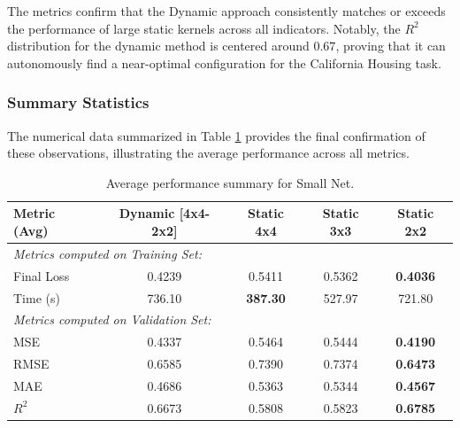 The metrics confirm that the Dynamic approach consistently matches or exceeds the performance of large static kernels across all indicators. Notably, the $R^2$ distribution for the dynamic method is centered around $0.67$, proving that it can autonomously find a near-optimal configuration for the California Housing task.

\subsubsection{Summary Statistics}

The numerical data summarized in Table \ref{tab:small_net_results} provides the final confirmation of these observations, illustrating the average performance across all metrics.

\begin{table}[h]
\centering
\scriptsize
\begin{tabular}{|l|c|c|c|c|}
\hline
\textbf{Metric (Avg)} & \textbf{Dynamic [4x4-2x2]} & \textbf{Static 4x4} & \textbf{Static 3x3} & \textbf{Static 2x2} \\ \hline
\multicolumn{5}{|l|}{\textit{Metrics computed on Training Set:}} \\ \hline
Final Loss            & 0.4239                     & 0.5411                & 0.5362                & \textbf{0.4036}                \\ \hline
Time (s)              & 736.10                     & \textbf{387.30}                & 527.97                & 721.80                \\ \hline
\multicolumn{5}{|l|}{\textit{Metrics computed on Validation Set:}} \\ \hline
MSE                   & 0.4337                     & 0.5464                & 0.5444                & \textbf{0.4190}                \\ \hline
RMSE                  & 0.6585                     & 0.7390                & 0.7374                & \textbf{0.6473}                \\ \hline
MAE                   & 0.4686                     & 0.5363                & 0.5344                & \textbf{0.4567}                \\ \hline
$R^2$                 & 0.6673                     & 0.5808                & 0.5823                & \textbf{0.6785}                \\ \hline
\end{tabular}
\caption{Average performance summary for Small Net.}
\label{tab:small_net_results}
\end{table}


